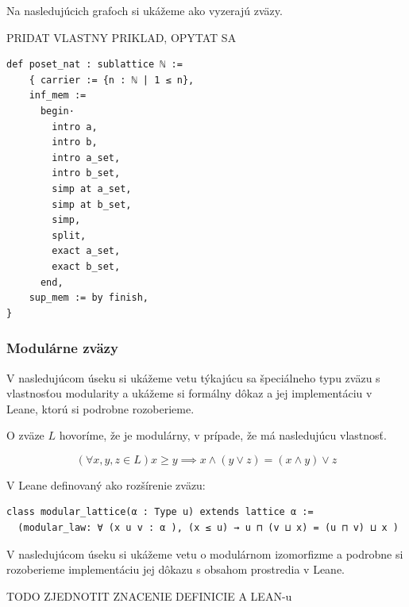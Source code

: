\documentclass[a4paper,10pt,oneside]{report}%
\begin{document}
Na nasledujúcich grafoch si ukážeme ako vyzerajú zväzy.

PRIDAT VLASTNY PRIKLAD, OPYTAT SA
\begin{lstlisting}
def poset_nat : sublattice ℕ :=
    { carrier := {n : ℕ | 1 ≤ n},
    inf_mem :=
      begin·
        intro a,
        intro b,
        intro a_set,
        intro b_set,
        simp at a_set,
        simp at b_set,
        simp,
        split,
        exact a_set,
        exact b_set,
      end,
    sup_mem := by finish,
}
\end{lstlisting}

\subsubsection{Modulárne zväzy}

V nasledujúcom úseku si ukážeme vetu týkajúcu sa špeciálneho typu zväzu s vlastnosťou
    modularity a ukážeme si formálny dôkaz a jej implementáciu v Leane, ktorú si
    podrobne rozoberieme.

O zväze $L$ hovoríme, že je modulárny, v prípade, že má nasledujúcu vlastnosť.

\begin{equation*}
    (\forall x,y,z \in L) x \geq y \implies x \wedge ( y \vee z) = (x \wedge y) \vee z
\end{equation*}

V Leane definovaný ako rozšírenie zväzu:

\begin{lstlisting}
class modular_lattice(α : Type u) extends lattice α :=
  (modular_law: ∀ (x u v : α ), (x ≤ u) → u ⊓ (v ⊔ x) = (u ⊓ v) ⊔ x )
\end{lstlisting}

V nasledujúcom úseku si ukážeme vetu o modulárnom izomorfizme a podrobne
    si rozoberieme implementáciu jej dôkazu s obsahom prostredia v Leane.

TODO ZJEDNOTIT ZNACENIE DEFINICIE A LEAN-u
\end{document}
